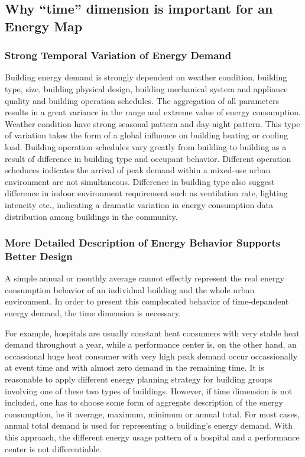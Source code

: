 \documentclass[hidelinks,12pt]{article}
\begin{document}
\subsection{Why ``time'' dimension is important for an Energy Map}
\subsubsection{Strong Temporal Variation of Energy Demand}
Building energy demand is strongly dependent on weather condition,
building type, size, building physical design, building mechanical
system and appliance quality and building operation schedules.  The
aggregation of all parameters results in a great variance in the range
and extreme value of energy consumption. Weather condition have strong
seasonal pattern and day-night pattern. This type of variation takes
the form of a global influence on building heating or cooling
load. Building operation schedules vary greatly from building to
building as a result of difference in building type and occupant
behavior. Different operation scheduces indicates the arrival of peak
demand within a mixed-use urban environment are not
simultaneous. Difference in building type also suggest difference in
indoor environment requirement such as ventilation rate, lighting
intencity etc., indicating a dramatic variation in energy consumption
data distribution among buildings in the community. 

\subsubsection{More Detailed Description of Energy Behavior Supports
  Better Design}
A simple annual or monthly average cannot effectly represent the real
energy consumption behavior of an individual building and the whole
urban environment. In order to present this complecated behavior of
time-depandent energy demand, the time dimension is necessary.

For example, hospitals are usually constant heat consumers with very
stable heat demand throughout a year, while a performance center is,
on the other hand, an occassional huge heat consumer with very high
peak demand occur occassionally at event time and with almost zero
demand in the remaining time. It is reasonable to apply different
energy planning strategy for building groups involving one of these
two types of buildings. However, if time dimension is not included,
one has to choose some form of aggregate description of the energy
consumption, be it average, maximum, minimum or annual total. For most
cases, annual total demand is used for representing a building's
energy demand. With this approach, the different energy usage pattern
of a hospital and a performance center is not differentiable.
\end{document}
